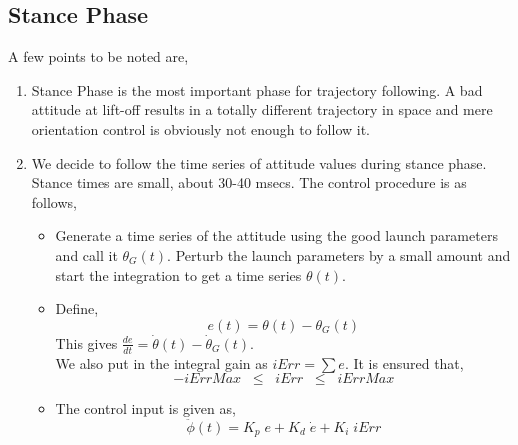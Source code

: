 \subsection*{Stance Phase}
A few points to be noted are,
\begin{enumerate}
  \item
  Stance Phase is the most important phase for trajectory following. A bad attitude at lift-off results in a totally different trajectory in space and mere orientation control is obviously not enough to follow it.
  \item
  We decide to follow the time series of attitude values during stance phase. Stance times are small, about 30-40 msecs. The control procedure is as follows,
  \begin{itemize}
    \item
    Generate a time series of the attitude using the good launch parameters and call it $\theta_G(t)$. Perturb the launch parameters by a small amount and start the integration to get a time series $\theta(t)$.
    \item
    Define,
    \begin{equation}
      e(t) = \theta(t) - \theta_G(t)
    \end{equation}
    This gives $\frac{d e}{d t} = \dot{\theta}(t) - \dot{\theta}_G(t)$.\\ We also put in the integral gain as $iErr = \sum e$. It is ensured that,
      \begin{equation*}
	-iErrMax\;\;\leq\;\;iErr\;\;\leq\;\;iErrMax
      \end{equation*}
    \item
    The control input is given as,
    \begin{equation}
     \ddot{\phi}(t) = K_p\;e + K_d\;\dot{e} + K_i\;iErr
    \end{equation}
  \end{itemize}
  \begin{figure}[!htp]
  \centering

\end{figure}
\end{enumerate}
